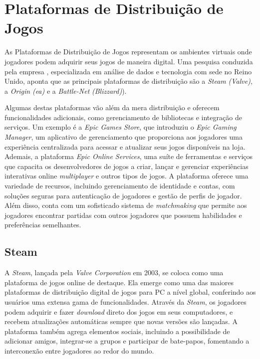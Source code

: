 \section{Plataformas de Distribuição de Jogos}

As Plataformas de Distribuição de Jogos representam os ambientes virtuais onde jogadores podem adquirir seus jogos de maneira digital. Uma pesquisa conduzida pela empresa \cite{games_distribution_platform}, especializada em análise de dados e tecnologia com sede no Reino Unido, aponta que as principais plataformas de distribuição são a \textit{\gls{Steam}} \textit{(\gls{Valve})}, a \textit{\gls{Origin}} \textit{(\ac{ea})} e a \textit{\gls{Battle-Net}} \textit{(\gls{Blizzard})}).

Algumas destas plataformas vão além da mera distribuição e oferecem funcionalidades adicionais, como gerenciamento de bibliotecas e integração de serviços. Um exemplo é a \textit{Epic Games Store}, que introduziu o \textit{Epic Gaming Manager}, um aplicativo de gerenciamento que proporciona aos jogadores uma experiência centralizada para acessar e atualizar seus jogos disponíveis na loja. Ademais, a plataforma \textit{Epic Online Services}, uma suíte de ferramentas e serviços que capacita os desenvolvedores de jogos a criar, lançar e gerenciar experiências interativas online \textit{multiplayer} e outros tipos de jogos. A plataforma oferece uma variedade de recursos, incluindo gerenciamento de identidade e contas, com soluções seguras para autenticação de jogadores e gestão de perfis de jogador. Além disso, conta com um sofisticado sistema de \textit{matchmaking} que permite aos jogadores encontrar partidas com outros jogadores que possuem habilidades e preferências semelhantes. 

\subsection{Steam}

A \textit{\gls{Steam}}, lançada pela \textit{\gls{Valve} Corporation} em 2003, se coloca como uma plataforma de jogos online de destaque. Ela emerge como uma das maiores plataformas de distribuição digital de jogos para PC a nível global, conferindo aos usuários uma extensa gama de funcionalidades. Através da \textit{\gls{Steam}}, os jogadores podem adquirir e fazer \textit{download} direto dos jogos em seus computadores, e recebem atualizações automáticas sempre que novas versões são lançadas. A plataforma também agrega elementos sociais, incluindo a possibilidade de adicionar amigos, integrar-se a grupos e participar de bate-papos, fomentando a interconexão entre jogadores ao redor do mundo.

